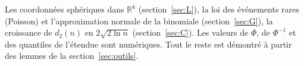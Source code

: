\documentclass[11pt,a4paper]{article}
\theoremstyle{tq}
\theoremstyle{remark}
\newcommand{\R}{\mathbb{R}}
\begin{document}
\begin{alerte}
Les coordonnées sphériques dans $\R^k$ (section~\ref{sec:L}), la loi des événements rares (Poisson) et l'approximation normale de la binomiale (section~\ref{sec:G}), la croissance de $d_2(n)$ en $2\sqrt{2\ln n}$ (section~\ref{sec:C}). Les valeurs de $\Phi$, de $\Phi^{-1}$ et des quantiles de l'étendue sont numériques. Tout le reste est démontré à partir des lemmes de la section~\ref{sec:outils}.
\end{alerte}
\end{document}

